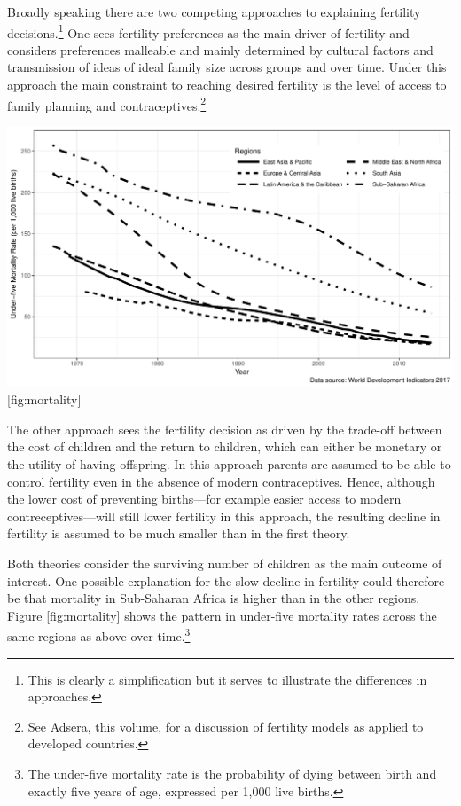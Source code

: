 Broadly speaking there are two competing approaches to explaining fertility decisions.\footnote{This is clearly a simplification but it serves to illustrate the differences in approaches.} One sees fertility preferences as the main driver of fertility and considers preferences malleable and mainly determined by cultural factors and transmission of ideas of ideal family size across groups and over time. Under this approach the main constraint to reaching desired fertility is the level of access to family planning and contraceptives.\footnote{See Adsera, this volume, for a discussion of fertility models as applied to developed countries.}

\includegraphics{../figures/childMortalityRatesBW.pdf} {[}fig:mortality{]}

The other approach sees the fertility decision as driven by the trade-off between the cost of children and the return to children, which can either be monetary or the utility of having offspring. In this approach parents are assumed to be able to control fertility even in the absence of modern contraceptives. Hence, although the lower cost of preventing births---for example easier access to modern contreceptives---will still lower fertility in this approach, the resulting decline in fertility is assumed to be much smaller than in the first theory.

Both theories consider the surviving number of children as the main outcome of interest. One possible explanation for the slow decline in fertility could therefore be that mortality in Sub-Saharan Africa is higher than in the other regions. Figure {[}fig:mortality{]} shows the pattern in under-five mortality rates across the same regions as above over time.\footnote{The under-five mortality rate is the probability of dying between birth and exactly five years of age, expressed per 1,000 live births.}

